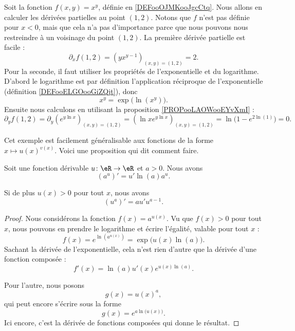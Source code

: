 	\begin{example}     \label{EXooGMRIooUucRez}
		Soit la fonction \( f(x,y)=x^y\), définie en \ref{DEFooOJMKooJgcCtq}. Nous allons en calculer les dérivées partielles au point \( (1,2)\). Notons que \( f\) n'est pas définie pour \( x<0\), mais que cela n'a pas d'importance parce que nous pouvons nous restreindre à un voisinage du point \( (1,2)\). La première dérivée partielle est facile :
		\[
			\partial_x f(1,2)=(yx^{y-1})_{(x,y)=(1,2)}=2.
		\]
		Pour la seconde, il faut utiliser les propriétés de l'exponentielle et du logarithme. D'abord le logarithme est par définition l'application réciproque de l'exponentielle (définition \ref{DEFooELGOooGiZQjt}), donc
		\begin{equation}
			x^y=\exp\big( \ln(x^y) \big).
		\end{equation}
		Ensuite nous calculons en utilisant la proposition \ref{PROPooLAOWooEYvXmI} :
		\[
			\partial_y f(1,2)=\partial_y\left(e^{y\ln x}\right)_{(x,y)=(1,2)}=\left(\ln x e^{y\ln x}\right)_{(x,y)=(1,2)}=\ln\big( 1- e^{2\ln(1)} \big)=0.
		\]
	\end{example}


	Cet exemple est facilement généralisable aux fonctions de la forme \( x\mapsto u(x)^{v(x)}\). Voici une proposition qui dit comment faire.
	\begin{proposition}     \label{PROPooKUULooKSEULJ}
		Soit une fonction dérivable \( u\colon \eR\to \eR\) et \( a>0\). Nous avons
		\begin{equation}
			\left( a^u\right)'=u'\ln(a)a^u.
		\end{equation}

		Si de plus \( u(x)>0\) pour tout \( x\), nous avons
		\begin{equation}
			\left( u^a \right)'=au'u^{a-1}.
		\end{equation}
	\end{proposition}

	\begin{proof}
		Nous considérons la fonction \( f(x)= a^{u(x)}\). Vu que \( f(x)>0\) pour tout \( x\), nous pouvons en prendre le logarithme et écrire l'égalité, valable pour tout \( x\) :
		\begin{equation}
			f(x)= e^{\ln(a^{u(x)})}=\exp\big( u(x)\ln(a) \big).
		\end{equation}
		Sachant la dérivée de l'exponentielle, cela n'est rien d'autre que la dérivée d'une fonction composée :
		\begin{equation}
			f'(x)=\ln(a) u'(x) e^{u(x)\ln(a)}.
		\end{equation}

		Pour l'autre, nous posons
		\begin{equation}
			g(x)=u(x)^a,
		\end{equation}
		qui peut encore s'écrire sous la forme
		\begin{equation}
			g(x)= e^{a\ln\big( u(x) \big)}.
		\end{equation}
		Ici encore, c'est la dérivée de fonctions composées qui donne le résultat.
	\end{proof}

